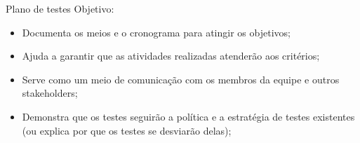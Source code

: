 
\begin{frame}{Plano de testes}
    Objetivo:
    \begin{itemize}
        \item Documenta os meios e o cronograma para atingir os objetivos;
        \item Ajuda a garantir que as atividades realizadas atenderão aos critérios; 
        \item Serve como um meio de comunicação com os membros da equipe e outros stakeholders; 
        \item Demonstra que os testes seguirão a política e a estratégia de testes existentes (ou explica por que os testes se desviarão delas);
    \end{itemize}
\end{frame}
